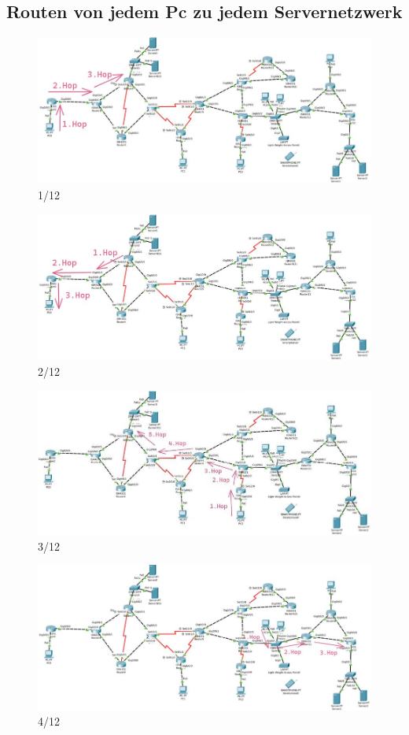 \documentclass[a4paper]{article}
\begin{document}
\subsection{Routen von jedem Pc zu jedem Servernetzwerk}
\begin{figure}[h]
	\centering
	\includegraphics[scale=0.5]{1.jpg}
	\caption{1/12}
\end{figure}
\begin{figure}[h]
	\centering
	\includegraphics[scale=0.5]{2.jpg}
	\caption{2/12}
\end{figure}
\begin{figure}[h]
	\centering
	\includegraphics[scale=0.5]{3.jpg}
	\caption{3/12}
\end{figure}
\begin{figure}
	\centering
	\includegraphics[scale=0.5]{4.jpg}
	\caption{4/12}
\end{figure}
\end{document}
